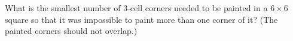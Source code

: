 What is the smallest number of $3$-cell corners needed to be painted in a $6\times 6$ square so that it was impossible to paint more than one corner of it?
(The painted corners should not overlap.)